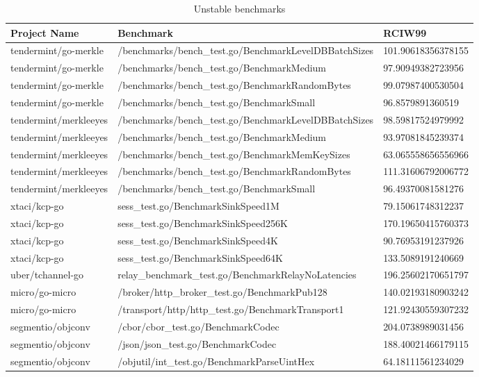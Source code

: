 \documentclass{seal_thesis}
\begin{document}
\begin{table}[H]
\begin{longtable}[c]{@{}lll@{}}
	\caption{Unstable benchmarks}
	\label{unstable}\\
	\toprule
	Project Name & Benchmark & RCIW99 \\* \midrule
	\endfirsthead
	\endhead
	\bottomrule
	\endfoot
	\endlastfoot
	tendermint/go-merkle & /benchmarks/bench\_test.go/BenchmarkLevelDBBatchSizes & 101.90618356378155 \\
	tendermint/go-merkle & /benchmarks/bench\_test.go/BenchmarkMedium & 97.90949382723956 \\
	tendermint/go-merkle & /benchmarks/bench\_test.go/BenchmarkRandomBytes & 99.07987400530504 \\
	tendermint/go-merkle & /benchmarks/bench\_test.go/BenchmarkSmall & 96.8579891360519 \\
	tendermint/merkleeyes & /benchmarks/bench\_test.go/BenchmarkLevelDBBatchSizes & 98.59817524979992 \\
	tendermint/merkleeyes & /benchmarks/bench\_test.go/BenchmarkMedium & 93.97081845239374 \\
	tendermint/merkleeyes & /benchmarks/bench\_test.go/BenchmarkMemKeySizes & 63.065558656556966 \\
	tendermint/merkleeyes & /benchmarks/bench\_test.go/BenchmarkRandomBytes & 111.31606792006772 \\
	tendermint/merkleeyes & /benchmarks/bench\_test.go/BenchmarkSmall & 96.49370081581276 \\
	xtaci/kcp-go & sess\_test.go/BenchmarkSinkSpeed1M & 79.15061748312237 \\
	xtaci/kcp-go & sess\_test.go/BenchmarkSinkSpeed256K & 170.19650415760373 \\
	xtaci/kcp-go & sess\_test.go/BenchmarkSinkSpeed4K & 90.76953191237926 \\
	xtaci/kcp-go & sess\_test.go/BenchmarkSinkSpeed64K & 133.5089191240669 \\
	uber/tchannel-go & relay\_benchmark\_test.go/BenchmarkRelayNoLatencies & 196.25602170651797 \\
	micro/go-micro & /broker/http\_broker\_test.go/BenchmarkPub128 & 140.02193180903242 \\
	micro/go-micro & /transport/http/http\_test.go/BenchmarkTransport1 & 121.92430559307232 \\
	segmentio/objconv & /cbor/cbor\_test.go/BenchmarkCodec & 204.0738989031456 \\
	segmentio/objconv & /json/json\_test.go/BenchmarkCodec & 188.40021466179115 \\
	segmentio/objconv & /objutil/int\_test.go/BenchmarkParseUintHex & 64.18111561234029 \\* \bottomrule
\end{longtable}
\end{table}
\end{document}
